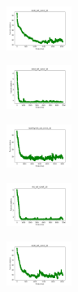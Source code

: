 \begin{figure}[H]
    \begin{subfigure}
        \centering
        \includegraphics[width=0.234\textwidth]{img/am01/ecoli_set_const_10_589741062_cost.png}
    \end{subfigure}
    \hfill
    \begin{subfigure}
        \centering
        \includegraphics[width=0.234\textwidth]{img/am01/rand_set_const_10_589741062_cost.png}
    \end{subfigure}
    \hfill
    \begin{subfigure}
        \centering
        \includegraphics[width=0.234\textwidth]{img/am01/newthyroid_set_const_10_589741062_cost.png}
    \end{subfigure}
    \hfill
    \begin{subfigure}
        \centering
        \includegraphics[width=0.234\textwidth]{img/am01/iris_set_const_10_277451237_cost.png}
    \end{subfigure}
    \hfill
    \begin{subfigure}
        \centering
        \includegraphics[width=0.234\textwidth]{img/am01/ecoli_set_const_10_277451237_cost.png}
    \end{subfigure}
    \hfill
    \begin{subfigure}
        \centering

\end{subfigure}
\end{figure}
